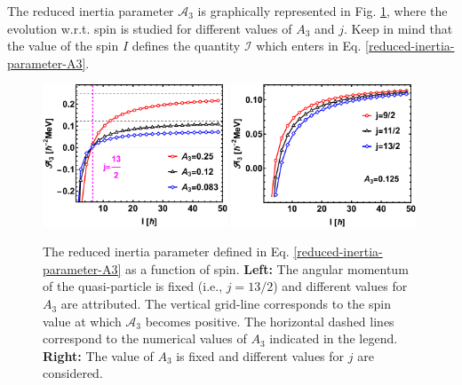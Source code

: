 The reduced inertia parameter $\mathscr{A}_3$ is graphically represented in Fig. \ref{reduced-inertia-A3-figs}, where the evolution w.r.t. spin is studied for different values of $A_3$ and $j$. Keep in mind that the value of the spin $I$ defines the quantity $\mathscr{I}$ which enters in Eq. \ref{reduced-inertia-parameter-A3}.
\begin{figure}
    \centering
    \includegraphics[width=0.49\textwidth]{Chapters/Figures/reducedInertia_fig1.pdf}
    \includegraphics[width=0.49\textwidth]{Chapters/Figures/reducedInertia_fig2.pdf}
    \caption{The reduced inertia parameter defined in Eq. \ref{reduced-inertia-parameter-A3} as a function of spin. \textbf{Left:} The angular momentum of the quasi-particle is fixed (i.e., $j=13/2$) and different values for $A_3$ are attributed. The vertical grid-line corresponds to the spin value at which $\mathscr{A}_3$ becomes positive. The horizontal dashed lines correspond to the numerical values of $A_3$ indicated in the legend. \textbf{Right:} The value of $A_3$ is fixed and different values for $j$ are considered.
    }
    \label{reduced-inertia-A3-figs}
\end{figure}

